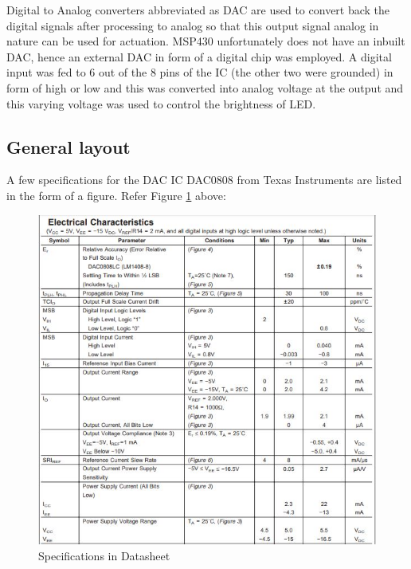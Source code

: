 \documentclass[12pt, letterpaper]{article}
\begin{document}
Digital to Analog converters abbreviated as DAC are used to convert back the digital signals after processing to analog so that this output signal analog in nature can be used for actuation. MSP430 unfortunately does not have an inbuilt DAC, hence an external DAC in form of a digital chip was employed. A digital input was fed to 6 out of the 8 pins of the IC (the other two were grounded) in form of high or low and this was converted into analog voltage at the output and this varying voltage was used to control the brightness of LED.


\subsection{General layout}
A few specifications for the DAC IC DAC0808 from Texas Instruments are listed in the form of a figure. Refer Figure \ref{fig:specs} above:
\begin{figure}[t]
	\centering
	\includegraphics[scale=0.75]{Datasheet_DAC0808.JPG}
	\caption{Specifications in Datasheet}
	\label{fig:specs}
\end{figure}

%
\end{document}
